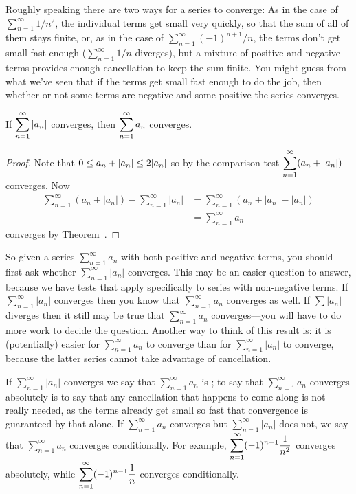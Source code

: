 
\nobreak
Roughly speaking there are two ways for a series to converge: As in
the case of $\sum_{n=1}^\infty 1/n^2$, the individual terms get small very quickly,
so that the sum of all of them stays finite, or, as in the case of
$\sum_{n=1}^\infty (-1)^{n+1}/n$, the terms don't get small fast enough ($\sum_{n=1}^\infty 1/n$
diverges), but a mixture of positive and negative terms provides
enough cancellation to keep the sum finite. You might guess from what
we've seen that if the terms get small fast enough to do the job, then
whether or not some terms are negative and some positive the series
converges. 

\begin{theorem}\label{thm:absolute-convergence-implies-convergence}
If $\displaystyle\sum_{n=1}^\infty |a_n|$ converges, then 
$\displaystyle\sum_{n=1}^\infty a_n$ converges.
\end{theorem}
\begin{proof}
Note that $\displaystyle 0\le a_n+|a_n|\le 2|a_n|$ so by the comparison test
$\displaystyle\sum_{n=1}^\infty (a_n+|a_n|)$ converges. Now
\begin{align*}
  \sum_{n=1}^\infty (a_n+|a_n|) -\sum_{n=1}^\infty |a_n|
  &= \sum_{n=1}^\infty \left( a_n+|a_n|-|a_n| \right) \\
  &= \sum_{n=1}^\infty a_n 
\end{align*}
converges by Theorem~.
\end{proof}

So given a series $\sum_{n=1}^\infty a_n$ with both positive and negative terms,
you should first ask whether $\sum_{n=1}^\infty |a_n|$ converges. This may be an
easier question to answer, because we have tests that apply
specifically to series with non-negative terms. If $\sum_{n=1}^\infty |a_n|$
converges then you know that $\sum_{n=1}^\infty a_n$ converges as well. If $\sum
|a_n|$ diverges then it still may be true that $\sum_{n=1}^\infty a_n$
converges---you will have to do more work to decide the question.
Another way to think of this result is: it is (potentially) easier for
$\sum_{n=1}^\infty a_n$ to converge than for $\sum_{n=1}^\infty |a_n|$ to converge, because the
latter series cannot take advantage of cancellation. 


If $\sum_{n=1}^\infty |a_n|$ converges we say that $\sum_{n=1}^\infty a_n$ is
; to say that $\sum_{n=1}^\infty a_n$ converges absolutely is to
say that any cancellation that happens to come along is not really
needed, as the terms already get small so fast that convergence is
guaranteed by that alone. If $\sum_{n=1}^\infty a_n$ converges but $\sum_{n=1}^\infty |a_n|$
does not, we say that $\sum_{n=1}^\infty a_n$ converges {\dfont
  conditionally}. For example,
$\displaystyle\sum_{n=1}^\infty (-1)^{n-1} {1\over n^2}$ converges absolutely,
while $\displaystyle\sum_{n=1}^\infty (-1)^{n-1} {1\over n}$ converges
conditionally.


